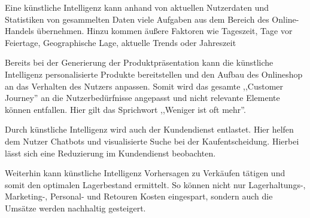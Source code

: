 Eine künstliche Intelligenz kann anhand von aktuellen Nutzerdaten und Statistiken von gesammelten Daten viele Aufgaben aus dem Bereich des Online-Handels übernehmen. Hinzu kommen äußere Faktoren wie Tageszeit, Tage vor Feiertage, Geographische Lage, aktuelle Trends oder Jahreszeit\vspace{0.2cm}

Bereits bei der Generierung der Produktpräsentation kann die künstliche Intelligenz personalisierte Produkte  bereitstellen und den Aufbau des Onlineshop an das Verhalten des Nutzers anpassen. Somit wird das gesamte ,,Customer Journey'' an die Nutzerbedürfnisse angepasst und nicht relevante Elemente können entfallen. Hier gilt das Sprichwort ,,Weniger ist oft mehr''.\vspace{0.2cm}

Durch künstliche Intelligenz wird auch der Kundendienst entlastet. Hier helfen dem Nutzer Chatbots und visualisierte Suche bei der Kaufentscheidung. Hierbei lässt sich eine Reduzierung im Kundendienst beobachten.\vspace{0.2cm}

Weiterhin kann künstliche Intelligenz Vorhersagen zu Verkäufen tätigen und somit den optimalen Lagerbestand ermittelt. So können nicht nur Lagerhaltungs-, Marketing-, Personal- und Retouren Kosten eingespart, sondern auch die Umsätze werden nachhaltig gesteigert.\vspace{0.2cm}

